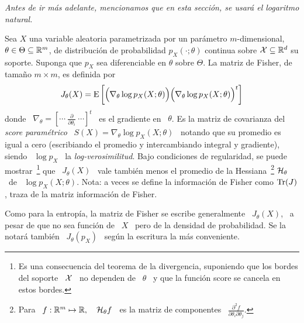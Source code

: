 {\it Antes de  ir m\'as adelante, mencionamos que en  esta secci\'on, se usar\'a
  el logaritmo natural.}
%
\begin{definicion}
  Sea   $X$   una   variable   aleatoria  parametrizada   por   un   par\'ametro
  $m$-dimensional, $\theta  \in \Theta \subseteq \mathbb{R}^m$,  de distribuci\'on de
  probabilidad  $p_X(\cdot;\theta)$  continua sobre  $\mathcal{X}  \subseteq \mathbb{R}^d$  su
  soporte. Suponga que  $p_X$ sea diferenciable en $\theta$  sobre $\Theta$.  La
  matriz de Fisher, de tama\~no $m \times m$, es definida por
  \[
  J_\theta(X)  =  \operatorname{E}\left[  \Big(  \nabla_\theta \log  p_X(X;\theta)  \Big)
    \Big( \nabla_\theta \log p_X(X;\theta) \Big)^t \right]
  \]
  donde \  $\nabla_\theta = \left[ \cdots  \: \frac{\partial}{\partial \theta_i}
    \:  \cdots \right]^t$ \  es el  gradiente en  \ $\theta$.   Es la  matriz de
  covarianza  del  {\it  score  param\'etrico}  \  $S(X)  =  \nabla_\theta  \log
  p_X(X;\theta)$  \ notando  que su  promedio es  igual a  cero  (escribiando el
  promedio y intercambiando integral y gradiente), siendo \ $\log p_X$ \ la {\it
    log-verosimilitud}.    Bajo    condiciones   de   regularidad,    se   puede
  mostrar~\footnote{Es   una  consecuencia  del   teorema  de   la  divergencia,
    suponiendo que los bordes del soporte \ $\mathcal{X}$ \ no dependen de \ $\theta$ \ y
    que la funci\'on  score se cancela en estos bordes.}   que \ $J_\theta(X)$ \
  vale tambi\'en menos  el promedio de la Hessiana~\footnote{Para  \ $f: \mathbb{R}^m
    \mapsto  \mathbb{R},  \quad \mathcal{H}_\theta  f$  \ es  la  matriz  de componentes  \
    $\frac{\partial^2 f}{\partial \theta_i \partial \theta_j}$.}  $\mathcal{H}_\theta$
  \ de  \ $\log  p_X(X;\theta)$.  Nota:  a veces se  define la  informaci\'on de
  Fisher como $\operatorname{Tr}(J)$, traza de la matriz informaci\'on de Fisher.
\end{definicion}
%
Como  para  la  entrop\'ia,  la  matriz  de Fisher  se  escribe  generalmente  \
$J_\theta(X)$, \ a pesar de que no sea  funci\'on de \ $X$ \ pero de la densidad
de  probabilidad.  Se  la  notar\'a  tambi\'en \  $J_\theta(p_X)$  \ seg\'un  la
escritura la m\'as conveniente.

